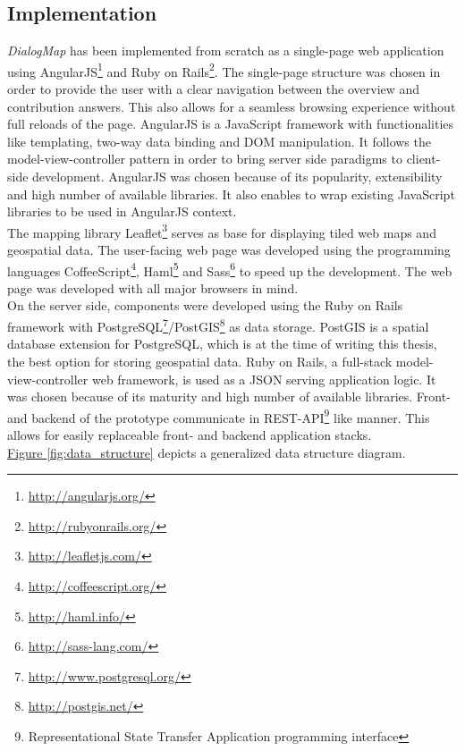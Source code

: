 \subsection{Implementation}
\label{sub:implementation}
\textit{DialogMap} has been implemented from scratch as a single-page web application using AngularJS\footnote{\url{http://angularjs.org/}} and Ruby on Rails\footnote{\url{http://rubyonrails.org/}}. The single-page structure was chosen in order to provide the user with a clear navigation between the overview and contribution answers. This also allows for a seamless browsing experience without full reloads of the page. AngularJS is a JavaScript framework with functionalities like templating, two-way data binding and DOM manipulation. It follows the model-view-controller pattern in order to bring server side paradigms to client-side development. AngularJS was chosen because of its popularity, extensibility and high number of available libraries. It also enables to wrap existing JavaScript libraries to be used in AngularJS context.\\
The mapping library Leaflet\footnote{\url{http://leafletjs.com/}} serves as base for displaying tiled web maps and geospatial data. The user-facing web page was developed using the programming languages CoffeeScript\footnote{\url{http://coffeescript.org/}}, Haml\footnote{\url{http://haml.info/}} and Sass\footnote{\url{http://sass-lang.com/}} to speed up the development. The web page was developed with all major browsers in mind. \\
On the server side, components were developed using the Ruby on Rails framework with PostgreSQL\footnote{\url{http://www.postgresql.org/}}/PostGIS\footnote{\url{http://postgis.net/}} as data storage. PostGIS is a spatial database extension for PostgreSQL, which is at the time of writing this thesis, the best option for storing geospatial data. Ruby on Rails, a full-stack model-view-controller web framework, is used as a JSON serving application logic. It was chosen because of its maturity and high number of available libraries. Front- and backend of the prototype communicate in REST-API\footnote{Representational State Transfer Application programming interface} like manner. This allows for easily replaceable front- and backend application stacks.\\
\hyperref[fig:data_structure]{Figure \ref{fig:data_structure}} depicts a generalized data structure diagram.

